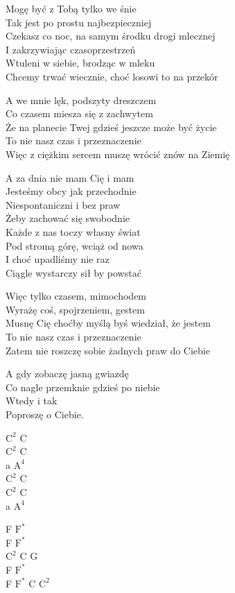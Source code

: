 \begin{text}
Mogę być z Tobą tylko we śnie\\
Tak jest po prostu najbezpieczniej\\
Czekasz co noc, na samym środku drogi mlecznej\\
I zakrzywiając czasoprzestrzeń\\
Wtuleni w siebie, brodząc w mleku\\
Chcemy trwać wiecznie, choć losowi to na przekór

A we mnie lęk, podszyty dreszczem\\
Co czasem miesza się z zachwytem\\
Że na planecie Twej gdzieś jeszcze może być życie\\
To nie nasz czas i przeznaczenie\\
Więc z ciężkim sercem muszę wrócić znów na Ziemię

A za dnia nie mam Cię i mam\\
Jesteśmy obcy jak przechodnie\\
Niespontaniczni i bez praw\\
Żeby zachować się swobodnie\\
Każde z nas toczy własny świat \\
Pod stromą górę, wciąż od nowa\\
I choć upadliśmy nie raz\\
Ciągle wystarczy sił by powstać

Więc tylko czasem, mimochodem\\
Wyrażę coś, spojrzeniem, gestem\\
Musnę Cię choćby myślą byś wiedział, że jestem\\
To nie nasz czas i przeznaczenie\\
Zatem nie roszczę sobie żadnych praw do Ciebie

A gdy zobaczę jasną gwiazdę\\
Co nagle przemknie gdzieś po niebie\\
Wtedy i tak\\
Poproszę o Ciebie.
\end{text}
\begin{chord}
    $\mathrm{C^2}$ C\\
    $\mathrm{C^2}$ C\\
    a $\mathrm{A^4}$\\
    $\mathrm{C^2}$ C\\
    $\mathrm{C^2}$ C\\
    a $\mathrm{A^4}$

    F $\mathrm{F^*}$\\
    F $\mathrm{F^*}$\\
    $\mathrm{C^2}$ C G\\
    F $\mathrm{F^*}$\\
    F $\mathrm{F^*}$ C $\mathrm{C^2}$
\end{chord}
